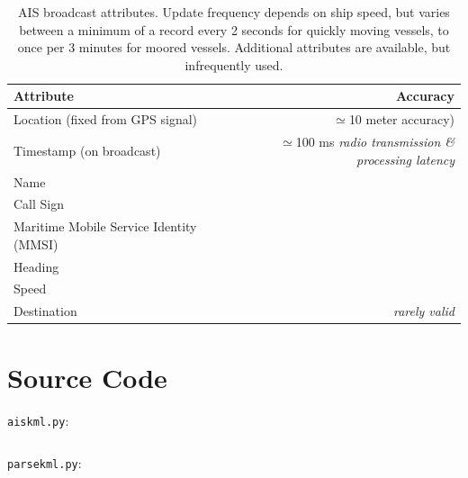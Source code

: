 \begin{table}[htbp]
  \begin{tabular}{lr}
    Attribute & Accuracy \\
    \hline
    Location (fixed from GPS signal) & $\simeq$10 meter accuracy) \\
    Timestamp (on broadcast) & $\simeq$100 ms \textit{radio transmission \& processing latency}\\
    Name \\
    Call Sign \\
    Maritime Mobile Service Identity (MMSI) \\
    Heading \\
    Speed \\
    Destination & \textit{rarely valid}
  \end{tabular}
  \caption{AIS broadcast attributes. Update frequency depends on ship speed, but varies between a minimum of a record every 2 seconds for quickly moving vessels, to once per 3 minutes for moored vessels. Additional attributes are available, but infrequently used.}
  \label{table:ais-broadcast-attributes}
\end{table}

\newpage

\section{Source Code}
\label{sec:source-code}


\texttt{aiskml.py}:
\inputminted[linenos,
             numbersep=5pt,
             frame=lines,
             framesep=2mm]{r}{../code/kml/aiskml.py}

\texttt{parsekml.py}:
\inputminted[linenos,
             numbersep=5pt,
             frame=lines,
             framesep=2mm]{r}{../code/kml/parsekml.py}


